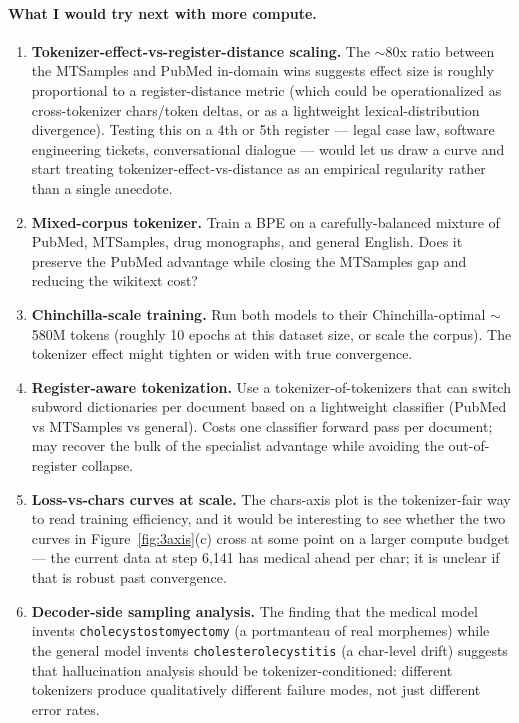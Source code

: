 \documentclass[11pt]{article}
\begin{document}
\paragraph{What I would try next with more compute.}

\begin{enumerate}[leftmargin=*, itemsep=0pt]
    \item \textbf{Tokenizer-effect-vs-register-distance scaling.} The $\sim$80x ratio between the MTSamples and PubMed in-domain wins suggests effect size is roughly proportional to a register-distance metric (which could be operationalized as cross-tokenizer chars/token deltas, or as a lightweight lexical-distribution divergence). Testing this on a 4th or 5th register --- legal case law, software engineering tickets, conversational dialogue --- would let us draw a curve and start treating tokenizer-effect-vs-distance as an empirical regularity rather than a single anecdote.
    \item \textbf{Mixed-corpus tokenizer.} Train a BPE on a carefully-balanced mixture of PubMed, MTSamples, drug monographs, and general English. Does it preserve the PubMed advantage while closing the MTSamples gap and reducing the wikitext cost?
    \item \textbf{Chinchilla-scale training.} Run both models to their Chinchilla-optimal $\sim$580M tokens (roughly 10 epochs at this dataset size, or scale the corpus). The tokenizer effect might tighten or widen with true convergence.
    \item \textbf{Register-aware tokenization.} Use a tokenizer-of-tokenizers that can switch subword dictionaries per document based on a lightweight classifier (PubMed vs MTSamples vs general). Costs one classifier forward pass per document; may recover the bulk of the specialist advantage while avoiding the out-of-register collapse.
    \item \textbf{Loss-vs-chars curves at scale.} The chars-axis plot is the tokenizer-fair way to read training efficiency, and it would be interesting to see whether the two curves in Figure~\ref{fig:3axis}(c) cross at some point on a larger compute budget --- the current data at step 6,141 has medical ahead per char; it is unclear if that is robust past convergence.
    \item \textbf{Decoder-side sampling analysis.} The finding that the medical model invents \texttt{cholecystostomyectomy} (a portmanteau of real morphemes) while the general model invents \texttt{cholesterolecystitis} (a char-level drift) suggests that hallucination analysis should be tokenizer-conditioned: different tokenizers produce qualitatively different failure modes, not just different error rates.
\end{enumerate}
\end{document}
